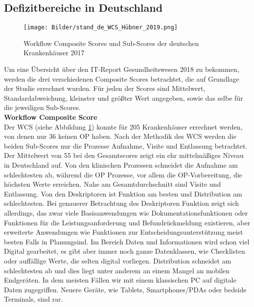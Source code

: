 \subsection{Defizitbereiche in Deutschland}
\label{sec:defizit_deutschland}
\begin{figure}[ht]
	\centering
 	\texttt{[image: Bilder/stand\_de\_WCS\_Hübner\_2019.png]}
	\caption{Workflow Composite Scores und Sub-Scores der deutschen Krankenhäuser 2017 \parencite[39]{huebner2019}}
	\label{fig:stand_de_WCS}
\end{figure}
Um eine Übersicht über den IT-Report Gesundheitswesen 2018 zu bekommen, werden die drei verschiedenen Composite Scores betrachtet, die auf Grundlage der Studie errechnet wurden. Für jeden der Scores sind Mittelwert, Standardabweichung, kleinster und größter Wert angegeben, sowie das selbe für die jeweiligen Sub-Scores.
\vspace{\parheadvspace}\\
\textbf{Workflow Composite Score}\\
Der WCS (siehe Abbildung \ref{fig:stand_de_WCS}) konnte für 205 Krankenhäuser errechnet werden, von denen nur 36 keinen OP haben. Nach der Methodik des WCS werden die beiden Sub-Scores nur die Prozesse Aufnahme, Visite und Entlassung betrachtet. Der Mittelwert von 55 bei den Gesamtscores zeigt ein ehr mittelmäßiges Niveau in Deutschland auf. Von den klinischen Prozessen schneidet die Aufnahme am schlechtesten ab, während die OP Prozesse, vor allem die OP-Vorbereitung, die höchsten Werte erreichen. Nahe am Gesamtdurchschnitt sind Visite und Entlassung. Von den Deskriptoren ist Funktion am besten und Distribution am schlechtesten. Bei genauerer Betrachtung des Deskriptoren Funktion zeigt sich allerdings, das zwar viele Basisanwendungen wie Dokumentationsfunktionen oder Funktionen für die Leistungsanforderung und Befundrückmeldung existieren, aber erweiterte Anwendungen wie Funktionen zur Entscheidungsunterstützung meist besten Falls \glqq in Planung\grqq{ }sind. Im Bereich Daten und Informationen wird schon viel Digital gearbeitet, es gibt aber immer noch ganze Datenklassen, wie Checklisten oder auffällige Werte, die selten digital vorliegen. Distribution schneidet am schlechtesten ab und dies liegt unter anderem an einem Mangel an mobilen Endgeräten. In dem meisten Fällen wir mit einem klassischen PC auf digitale Daten zugegriffen. Neuere Geräte, wie Tablets, Smartphones/PDAs oder bedside Terminals, sind rar. \parencite{huebner2019}
\vspace{\parheadvspace}\\
